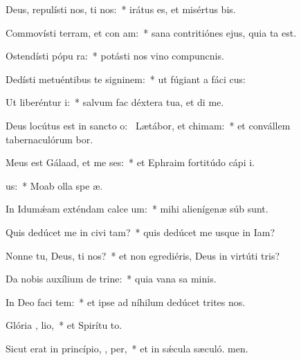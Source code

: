 \item Deus, repulísti nos,  ti nos:~* irátus es, et misértus  bis.
\item Commovísti terram, et con am:~* sana contritiónes ejus, quia ta est.
\item Ostendísti pópu  ra:~* potásti nos vino compuncnis.
\item Dedísti metuéntibus te signinem:~* ut fúgiant a fáci cus:
\item Ut liberéntur  i:~* salvum fac déxtera tua, et di me.
\item Deus locútus est in sancto o:~\pscross{} Lætábor, et  chimam:~* et convállem tabernaculórum bor.
\item Meus est Gálaad, et me  ses:~* et Ephraim fortitúdo cápi i.
\item {}  us:~* Moab olla spe æ.
\item In Idumǽam exténdam calce um:~* mihi alienígenæ súb sunt.
\item Quis dedúcet me in civi tam?~* quis dedúcet me usque in Iam?
\item Nonne tu, Deus,  ti nos?~* et non egrediéris, Deus in virtúti tris?
\item Da nobis auxílium de trine:~* quia vana sa minis.
\item In Deo faci tem:~* et ipse ad níhilum dedúcet trites nos.
\item Glória ,  lio,~* et Spirítu to.
\item Sicut erat in princípio,  ,  per,~* et in sǽcula sæculó. men.
